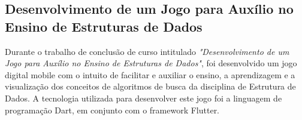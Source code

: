 \subsection{Desenvolvimento de um Jogo para Auxílio no Ensino de Estruturas de Dados}

Durante o trabalho de conclusão de curso intitulado \textit{"Desenvolvimento de um Jogo para Auxílio no Ensino de Estruturas de Dados"}, foi desenvolvido um jogo digital mobile com o intuito de facilitar e auxiliar o ensino, a aprendizagem e a visualização dos conceitos de algoritmos de busca da disciplina de Estrutura de Dados. A tecnologia utilizada para desenvolver este jogo foi a linguagem de programação Dart, em conjunto com o framework Flutter. \cite{glatz2023desenvolvimento}


